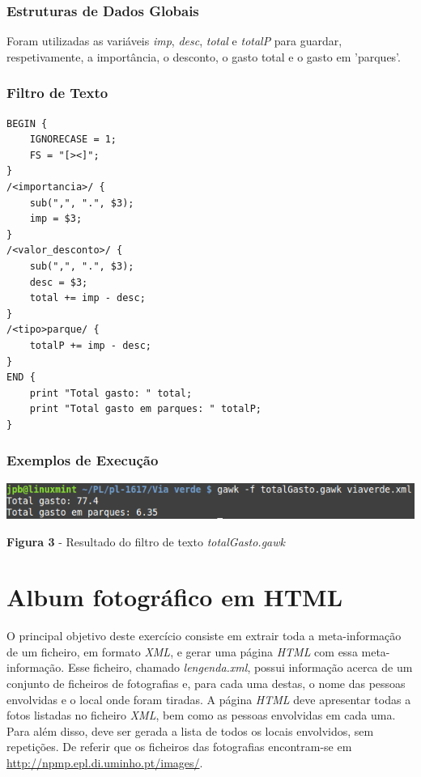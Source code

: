 \documentclass{article}
\begin{document}
\subsubsection{Estruturas de Dados Globais}

Foram utilizadas as variáveis \emph{imp}, \emph{desc}, \emph{total} e \emph{totalP} para guardar, respetivamente, a importância, o desconto, o gasto total e o gasto em 'parques'.

\subsubsection{Filtro de Texto}

\begin{lstlisting}
BEGIN {
	IGNORECASE = 1;
	FS = "[><]";
}
/<importancia>/ {
	sub(",", ".", $3);
	imp = $3;
}
/<valor_desconto>/ {
	sub(",", ".", $3);
	desc = $3;
	total += imp - desc;
}
/<tipo>parque/ {
	totalP += imp - desc;
}
END {
	print "Total gasto: " total;
	print "Total gasto em parques: " totalP;
}
\end{lstlisting}

\paragraph{}
\subsubsection{Exemplos de Execução}

\begin{center}
    \includegraphics[scale=1]{imagens/totalGasto}
    \caption{\textbf{Figura 3} - Resultado do filtro de texto \emph{totalGasto.gawk}}
\end{center}

\newpage
\section{Album fotográfico em HTML}

O principal objetivo deste exercício consiste em extrair toda a meta-informação de um ficheiro, em formato \emph{XML}, e gerar uma página \emph{HTML} com essa meta-informação. Esse ficheiro, chamado \emph{lengenda.xml}, possui informação acerca de um conjunto de ficheiros de fotografias e, para cada uma destas, o nome das pessoas envolvidas e o local onde foram tiradas. A página \emph{HTML} deve apresentar todas a fotos listadas no ficheiro \emph{XML}, bem como as pessoas envolvidas em cada uma. Para além disso, deve ser gerada a lista de todos os locais envolvidos, sem repetições. De referir que os ficheiros das fotografias encontram-se em \url{http://npmp.epl.di.uminho.pt/images/}.
\end{document}
